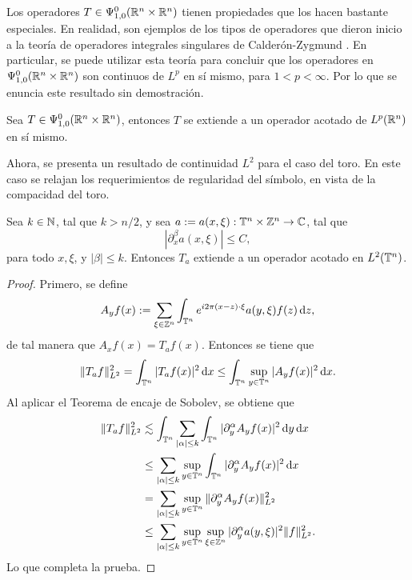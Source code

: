 \begin{remark}
	Los operadores $T\in\Psi^0_{1, 0}(\mathbb{R}^n\times\mathbb{R}^n)$ tienen propiedades que los hacen bastante especiales. En realidad, son ejemplos de los tipos de operadores que dieron inicio a la teoría de operadores integrales singulares de Calderón-Zygmund \cite{calderon-zygmund}. En particular, se puede utilizar esta teoría para concluir que los operadores en $\Psi^0_{1, 0}(\mathbb{R}^n\times\mathbb{R}^n)$ son continuos de $L^p$ en sí mismo, para $1<p<\infty$. Por lo que se enuncia este resultado sin demostración.
\end{remark}
\begin{theorem}\label{theo:Lp-boundedness-S0}
	Sea $T\in\Psi^0_{1, 0}(\mathbb{R}^n\times\mathbb{R}^n)$, entonces $T$ se extiende a un operador acotado de $L^p(\mathbb{R}^n)$ en sí mismo.
\end{theorem}
Ahora, se presenta un resultado de continuidad $L^2$ para el caso del toro. En este caso se relajan los requerimientos de regularidad del símbolo, en vista de la compacidad del toro.
\begin{theorem}\label{theo:L2-boundedness-T-C}
	Sea $k\in\mathbb{N}$, tal que $k>n/2$, y sea $a:=a(x,\xi):\mathbb{T}^n\times\mathbb{Z}^n\to\mathbb{C}$, tal que
	\begin{equation*}
		|\partial^\beta_x a(x, \xi)| \leq C,
	\end{equation*}
	para todo $x, \xi$, y $|\beta|\leq k$. Entonces $T_a$ extiende a un operador acotado en $L^2(\mathbb{T}^n)$.
\end{theorem}
\begin{proof}
	Primero, se define 
	\begin{equation*}
		A_yf(x) := \sum_{\xi\in\mathbb{Z}^n} \int_{\mathbb{T}^n} e^{i2\pi (x-z)\cdot\xi} a(y, \xi) f(z) \mathop{}\!\mathrm{d} z, 
	\end{equation*}
	de tal manera que $A_xf(x) = T_af(x)$. Entonces se tiene que
	\begin{equation*}
		\|T_af\|_{L^2}^2 = \int_{\mathbb{T}^n} |T_af(x)|^2 \mathop{}\!\mathrm{d} x \leq \int_{\mathbb{T}^n} \sup_{y\in\mathbb{T}^n} |A_yf(x)|^2 \mathop{}\!\mathrm{d} x.
	\end{equation*}
	Al aplicar el Teorema de encaje de Sobolev, se obtiene que
	\begin{align*}
		\|T_af\|_{L^2}^2 & \lesssim \int_{\mathbb{T}^n} \sum_{|\alpha|\leq k} \int_{\mathbb{T}^n} |\partial^\alpha_yA_yf(x)|^2 \mathop{}\!\mathrm{d} y \mathop{}\!\mathrm{d} x \\
		& \leq \sum_{|\alpha|\leq k} \sup_{y\in\mathbb{T}^n}  \int_{\mathbb{T}^n} |\partial^\alpha_yA_yf(x)|^2 \mathop{}\!\mathrm{d} x\\
		& =  \sum_{|\alpha|\leq k} \sup_{y\in\mathbb{T}^n} \|\partial^\alpha_yA_yf(x)\|_{L^2}^2 \\
		& \leq \sum_{|\alpha|\leq k} \sup_{y\in\mathbb{T}^n}  \sup_{\xi\in\mathbb{Z}^n} |\partial^\alpha_y a(y, \xi)|^2 \|f\|_{L^2}^2.
	\end{align*}
	Lo que completa la prueba.
\end{proof}
